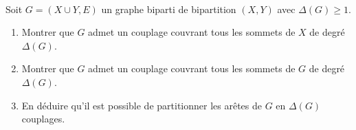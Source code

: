 \begin{td-exo}\,\\ %
	Soit \(G = (X\cup Y, E)\) un graphe biparti de bipartition \((X, Y)\)
	avec \(\Delta(G) \geq 1\).
	\begin{enumerate}
		\item Montrer que \(G\) admet un couplage couvrant tous les sommets de \(X\) de degré \(\Delta(G)\).
		\item Montrer que \(G\) admet un couplage couvrant tous les sommets de \(G\) de degré \(\Delta(G)\).
		\item En déduire qu'il est possible de partitionner les arêtes de \(G\) en \(\Delta(G)\) couplages.
	\end{enumerate}
\end{td-exo}

